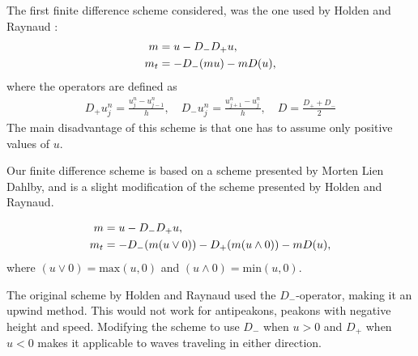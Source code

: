 The first finite difference scheme considered, was the one used by Holden and Raynaud \cite{holden2006convergence}:
\begin{align}
m &= u - D_{-}D_{+}u, \notag \\ 
m_t &= -D_{-}(mu) - mD(u),
\end{align}
where the operators are defined as
\begin{align}
\label{eq:operators}
D_{+}u_{j}^{n} = \frac{u_{j}^{n}-u_{j-1}^{n}}{h},\quad
D_{-}u_{j}^{n} = \frac{u_{j+1}^{n}-u_{j}^{n}}{h},\quad
D = \frac{D_{+}+D_{-}}{2}
\end{align}
The main disadvantage of this scheme is that one has to assume only positive values of $u$.

Our finite difference scheme is based on a scheme presented by Morten Lien Dahlby\cite{dahlby2007geometric}, and is a slight modification of the scheme presented by Holden and Raynaud.

\begin{align}
m &= u - D_{-}D_{+}u, \notag \\ 
m_t &= -D_{-}(m(u \vee 0)) -D_{+}(m(u \wedge 0)) - mD(u), 
\end{align}
where $(u \vee 0) = \text{max}(u,0)$ and $(u \wedge 0) = \text{min}(u,0)$.

The original scheme by Holden and Raynaud used the $D_{-}$-operator, making it an upwind method. This would not work for antipeakons, peakons with negative height and speed. Modifying the scheme to use  $D_{-}$ when $u > 0$ and $D_{+}$ when $ u < 0$ makes it applicable to waves traveling in either direction. 

